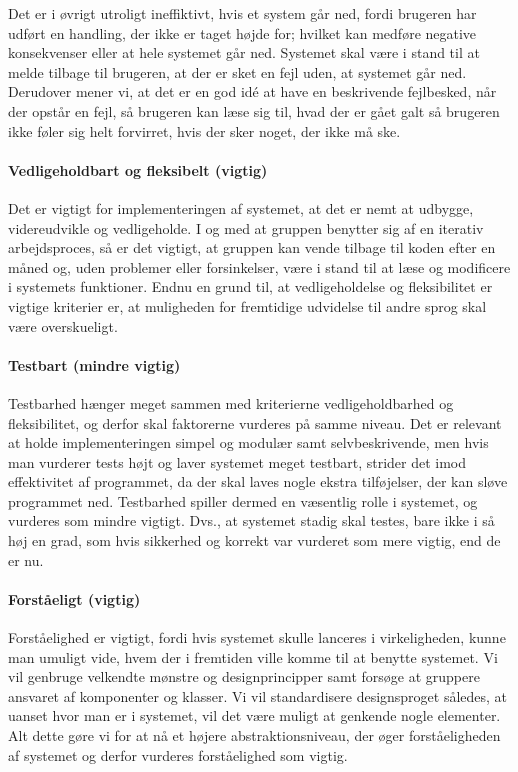 Det er i øvrigt utroligt ineffiktivt, hvis et system går ned, fordi brugeren har udført en handling, der ikke er taget højde for; hvilket kan medføre negative konsekvenser eller at hele systemet går ned. Systemet skal være i stand til at melde tilbage til brugeren, at der er sket en fejl uden, at systemet går ned. Derudover mener vi, at det er en god idé at have en beskrivende fejlbesked, når der opstår en fejl, så brugeren kan læse sig til, hvad der er gået galt så brugeren ikke føler sig helt forvirret, hvis der sker noget, der ikke må ske.

\paragraph{Vedligeholdbart og fleksibelt (vigtig)} 
Det er vigtigt for implementeringen af systemet, at det er nemt at udbygge, videreudvikle og vedligeholde. I og med at gruppen benytter sig af en iterativ arbejdsproces, så er det vigtigt, at gruppen kan vende tilbage til koden efter \fx en måned og, uden problemer eller forsinkelser, være i stand til at læse og modificere i systemets funktioner. Endnu en grund til, at vedligeholdelse og fleksibilitet er vigtige kriterier er, at muligheden for fremtidige udvidelse til \fx andre sprog skal være overskueligt.

\paragraph{Testbart (mindre vigtig)} 
Testbarhed hænger meget sammen med kriterierne vedligeholdbarhed og fleksibilitet, og derfor skal faktorerne vurderes på samme niveau. Det er relevant at holde implementeringen simpel og modulær samt selvbeskrivende, men hvis man vurderer tests højt og laver systemet meget testbart, strider det imod effektivitet af programmet, da der skal laves nogle ekstra tilføjelser, der kan sløve programmet ned. Testbarhed spiller dermed en væsentlig rolle i systemet, og vurderes som mindre vigtigt. Dvs., at systemet stadig skal testes, bare ikke i så høj en grad, som hvis sikkerhed og korrekt var vurderet som mere vigtig, end de er nu.

\paragraph{Forståeligt (vigtig)} 
Forståelighed er vigtigt, fordi hvis systemet skulle lanceres i virkeligheden, kunne man umuligt vide, hvem der i fremtiden ville komme til at benytte systemet. Vi vil genbruge velkendte mønstre og designprincipper samt forsøge at gruppere ansvaret af komponenter og klasser. Vi vil standardisere designsproget således, at uanset hvor man er i systemet, vil det være muligt at genkende nogle elementer. Alt dette gøre vi for at nå et højere abstraktionsniveau, der øger forståeligheden af systemet og derfor vurderes forståelighed som vigtig. 
 
